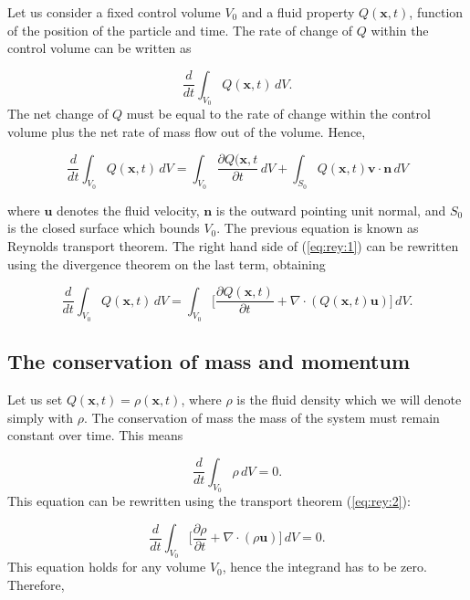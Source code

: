 \documentclass[a4paper,11pt,oneside]{book}
\begin{document}
Let us consider a fixed control volume $V_0$ and a fluid property $Q(\mathbf{x}, t)$, function of the position of the particle and time. The rate of change of $Q$ within the control volume can be written as

\begin{equation}
\frac{d}{dt} \int_{V_0} Q(\mathbf{x}, t) \, dV.
\end{equation}
The net change of $Q$ must be equal to the rate of change within the control volume plus the net rate of mass flow out of the volume. Hence,


\begin{equation}
\label{eq:rey:1}
\frac{d}{dt} \int_{V_0} Q(\mathbf{x}, t) \, dV = 
\int_{V_0} \frac{\partial Q(\mathbf{x}, t}{\partial t} \, dV +
\int_{S_0} Q(\mathbf{x}, t) \mathbf{v} \cdot \mathbf{n} \, dV
\end{equation}

where $\mathbf{u}$ denotes the fluid velocity, $\mathbf{n}$ is the outward pointing unit normal, and $S_0$ is the closed surface which bounds $V_0$. The previous equation is known as Reynolds transport theorem. The right hand side of (\ref{eq:rey:1}) can be rewritten using the divergence theorem on the last term, obtaining

\begin{equation}
\label{eq:rey:2}
\frac{d}{dt} \int_{V_0} Q(\mathbf{x}, t) \, dV = 
\int_{V_0} \Big[ \frac{\partial Q(\mathbf{x}, t) }{\partial t} + \nabla \cdot (Q(\mathbf{x}, t) \mathbf{\mathbf{u}})   \Big] \, d V.
\end{equation}

\subsection{The conservation of mass and momentum}
Let us set $Q(\mathbf{x}, t) = \rho(\mathbf{x}, t)$, where $\rho$ is the fluid density which we will denote simply with $\rho$. The conservation of mass the mass of the system must remain constant over time. This means

\begin{equation}
\label{eq:rey:3}
\frac{d}{dt} \int_{V_0} \rho  \, dV = 0.
\end{equation}
This equation can be rewritten using the transport theorem (\ref{eq:rey:2}):

\begin{equation}
\label{eq:rey:4}
\frac{d}{dt} \int_{V_0} \Big[ \frac{\partial \rho}{\partial t	} + \nabla \cdot (\rho \mathbf{u}) \Big] \, dV = 0.
\end{equation}
This equation holds for any volume $V_0$, hence the integrand has to be zero. Therefore, 
\end{document}
